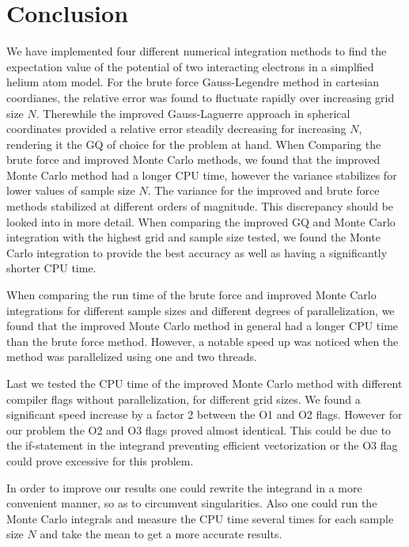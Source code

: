 \documentclass[10pt, twocolumn]{aastex62}
\begin{document}
\section{Conclusion} \label{sec:conclusion}
We have implemented four different numerical integration methods to find the
expectation value of the potential of two interacting electrons in a simplfied
helium atom model. For the brute force Gauss-Legendre method in cartesian
coordianes, the relative error was found to fluctuate rapidly over increasing
grid size $N$. Therewhile the improved Gauss-Laguerre approach in spherical
coordinates provided a relative error steadily decreasing for increasing $N$,
rendering it the GQ of choice for the problem at hand. When Comparing the brute
force and improved Monte Carlo methods, we found that the improved Monte Carlo
method had a longer CPU time, however the variance stabilizes for lower values
of sample size $N$. The variance for the improved and brute force methods
stabilized at different orders of magnitude. This discrepancy should be looked
into in more detail. When comparing the improved GQ and Monte Carlo integration
with the highest grid and sample size tested, we found the Monte Carlo
integration to provide the best accuracy as well as having a significantly
shorter CPU time.

When comparing the run time of the brute force and improved Monte Carlo
integrations for different sample sizes and different degrees of
parallelization, we found that the improved Monte Carlo method in general had a
longer CPU time than the brute force method. However, a notable speed up was
noticed when the method was parallelized using one and two threads.

Last we tested the CPU time of the improved Monte Carlo method with different
compiler flags without parallelization, for different grid sizes. We found a
significant speed increase by a factor 2 between the O1 and O2 flags. However
for our problem the O2 and O3 flags proved almost identical. This could be due to the
if-statement in the integrand preventing efficient vectorization or the O3 flag
could prove excessive for this problem.

In order to improve our results one could rewrite the integrand in a more
convenient manner, so as to circumvent singularities. Also one could run the
Monte Carlo integrals and measure the CPU time several times for each sample size
$N$ and take the mean to get a more accurate results.

\nocite{jensen:2019}

  
\end{document}
